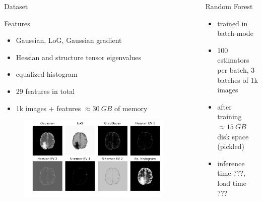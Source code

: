 \documentclass[final]{beamer}
\newlength{\sepwid}
\newlength{\onecolwid}
\newlength{\twocolwid}
\begin{document}
\begin{frame}[t]
\begin{columns}[t]
\begin{column}{\onecolwid}
\begin{alertblock}{Dataset}
\end{alertblock}

\begin{alertblock}{Features}
\begin{itemize}[label={}]
\item Gaussian, LoG, Gaussian gradient
\item Hessian and structure tensor eigenvalues
\item equalized histogram
\item 29 features in total
\item 1k images + features $\approx \SI{30}{GB}$ of memory
\end{itemize}
\begin{figure}
\centering
\includegraphics[width=0.99\textwidth]{features}
\end{figure}
\end{alertblock}


\end{column} %

\begin{column}{\sepwid}\end{column} %

\begin{column}{\twocolwid} %

\begin{columns}[t,totalwidth=\twocolwid] %

\begin{column}{\onecolwid}\vspace{-.6in} %

\begin{alertblock}{Random Forest}
\begin{itemize}[label={}]
\item trained in batch-mode \cite{batchrf}
\item 100 estimators per batch, 3 batches of 1k images
\item after training $\approx \SI{15}{GB}$ disk space (pickled)
\item inference time ???, load time ???
\end{itemize}
\end{alertblock}


\end{column}
\end{columns}
\end{column}
\end{columns}
\end{frame}
\end{document}
